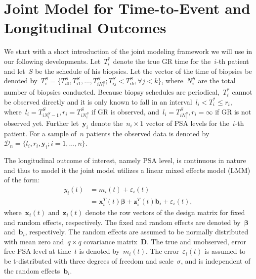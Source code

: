 \section{Joint Model for Time-to-Event and Longitudinal Outcomes}
\label{c2:sec:jm_framework}
We start with a short introduction of the joint modeling framework we will use in our following developments. Let~$T_i^*$ denote the true GR time for the~$i$-th patient and let~$S$ be the schedule of his biopsies. Let the vector of the time of biopsies be denoted by~$T_i^S = \{T^S_{i0}, T^S_{i1}, \ldots, T^S_{i{N_i^S}}; T^S_{ij} < T^S_{ik}, \forall j<k\}$, where~$N_i^S$ are the total number of biopsies conducted. Because biopsy schedules are periodical,~$T_i^*$ cannot be observed directly and it is only known to fall in an interval~$l_i < T_i^* \leq r_i$, where~$l_i = T^S_{i{N_i^S - 1}}, r_i = T^S_{i{N_i^S}}$ if GR is observed, and~$l_i = T^S_{i{N_i^S}}, r_i=\infty$ if GR is not observed yet. Further let~$\boldsymbol{y}_i$ denote the~$n_i \times 1$ vector of PSA levels for the~$i$-th patient. For a sample of~$n$ patients the observed data is denoted by~$\mathcal{D}_n = \{l_i, r_i, \boldsymbol{y}_i; i = 1, \ldots, n\}$.

The longitudinal outcome of interest, namely PSA level, is continuous in nature and thus to model it the joint model utilizes a linear mixed effects model (LMM) of the form:
\begin{equation*}
\begin{split}
y_i(t) &= m_i(t) + \varepsilon_i(t)\\
&=\boldsymbol{x}_i^T(t) \boldsymbol{\beta} + \boldsymbol{z}_i^T(t) \boldsymbol{b}_i + \varepsilon_i(t),
\end{split}
\end{equation*}
where~$\boldsymbol{x}_i(t)$ and~$\boldsymbol{z}_i(t)$ denote the row vectors of the design matrix for fixed and random effects, respectively. The fixed and random effects are denoted by~$\boldsymbol{\beta}$ and~$\boldsymbol{b}_i$, respectively. The random effects are assumed to be normally distributed with mean zero and~$q \times q$ covariance matrix~$\boldsymbol{D}$. The true and unobserved, error free PSA level at time~$t$ is denoted by~$m_i(t)$. The error~$\varepsilon_i(t)$ is assumed to be t-distributed with three degrees of freedom and scale~$\sigma$, and is independent of the random effects~$\boldsymbol{b}_i$.


